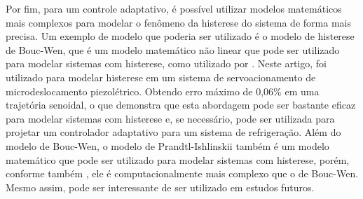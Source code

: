 Por fim, para um controle adaptativo, é possível utilizar modelos matemáticos mais complexos para modelar o fenômeno da histerese do sistema de forma mais precisa. Um exemplo de modelo que poderia ser utilizado é o modelo de histerese de Bouc-Wen, que é um modelo matemático não linear que pode ser utilizado para modelar sistemas com histerese, como utilizado por \textcite{ZHANG2024112387}. Neste artigo, foi utilizado para modelar histerese em um sistema de servoacionamento de microdeslocamento piezolétrico. Obtendo erro máximo de 0,06\% em uma trajetória senoidal, o que demonstra que esta abordagem pode ser bastante eficaz para modelar sistemas com histerese e, se necessário, pode ser utilizada para projetar um controlador adaptativo para um sistema de refrigeração. Além do modelo de Bouc-Wen, o modelo de Prandtl-Ishlinskii também é um modelo matemático que pode ser utilizado para modelar sistemas com histerese, porém, conforme também \textcite{ZHANG2024112387}, ele é computacionalmente mais complexo que o de Bouc-Wen. Mesmo assim, pode ser interessante de ser utilizado em estudos futuros.





